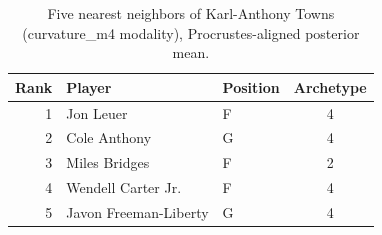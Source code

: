 \begin{table}[htbp]
  \centering\small
  \begin{tabular}{rllc}
    \toprule
    Rank & Player & Position & Archetype \\
    \midrule
    1 & Jon Leuer & F & 4 \\
    2 & Cole Anthony & G & 4 \\
    3 & Miles Bridges & F & 2 \\
    4 & Wendell Carter Jr. & F & 4 \\
    5 & Javon Freeman-Liberty & G & 4 \\
    \bottomrule
  \end{tabular}
  \caption{Five nearest neighbors of Karl-Anthony Towns (curvature_m4 modality), Procrustes-aligned posterior mean.}
  \label{tab:Karl_Anthony_Towns_neighbors_curvature_m4}
\end{table}

